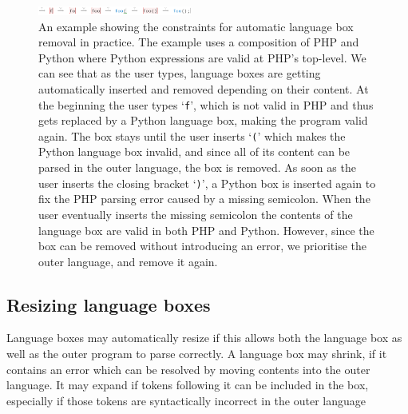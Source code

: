 \documentclass[sigplan,screen]{acmart}\settopmatter{printfolios=true,printccs=false,printacmref=false}
\newcommand{\qtt}[1]{`\texttt{#1}'\xspace}
\begin{document}
\begin{figure}
\begin{center}
\vspace{0.8em}
\includegraphics[width=0.45\textwidth]{images/autoremove_foo.png}
\vspace{-0.8em}
\end{center}
\caption{An example showing the constraints for automatic language box removal in practice.
The example uses a composition of PHP and Python where Python expressions are valid at
PHP's top-level.
We can see that as the user types, language boxes are getting automatically
inserted and removed depending on their content. At the beginning the user types
\qtt{f}, which is not valid in PHP and thus gets replaced by a Python
language box, making the program valid again. The box stays until the user
inserts \qtt{(} which makes the Python language box invalid, and since all of
its content can be parsed in the outer language, the box is removed.
As soon as the user inserts the closing bracket \qtt{)}, a Python box is
inserted again to fix the PHP parsing error caused by a missing semicolon. When the
user eventually inserts the missing semicolon the contents of the language box
are valid in both PHP and Python. However, since the box can be removed
without introducing an error, we prioritise the outer
language, and remove it again.}
\label{fig_autoremoval}
\end{figure}


\subsection{Resizing language boxes}

Language boxes may automatically resize if this allows both the language box as
well as the outer program to parse correctly. A language box may shrink, if it
contains an error which can be resolved by moving contents into the outer
language. It may expand if tokens following it can be included in the box,
especially if those tokens are syntactically incorrect in the outer language
\end{document}
